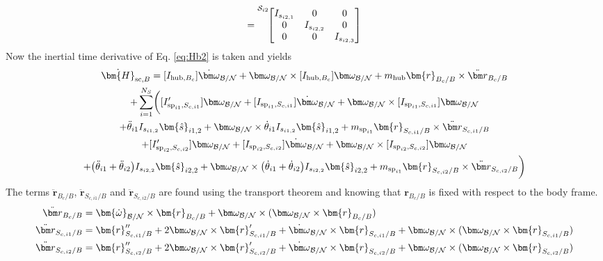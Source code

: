 \begin{equation}
	[I_{\text{sp}_{i2},S_{c,i2}}] = {\vphantom{\begin{bmatrix}
				I_{s_{i2,1}} & 0 & 0 \\
				0 & I_{s_{i2,2}} & 0 \\
				0 & 0 & I_{s_{i2,3}}
	\end{bmatrix}}}^{\mathcal{S}_{i2}\!}{\begin{bmatrix}
			I_{s_{i2,1}} & 0 & 0 \\
			0 & I_{s_{i2,2}} & 0 \\
			0 & 0 & I_{s_{i2,3}}
	\end{bmatrix}}
\end{equation}
Now the inertial time derivative of Eq. \eqref{eq:Hb2} is taken and yields
\begin{multline}
	\dot{\bm{H}}_{\text{sc},B} = [I_{\text{hub},B_c}] \dot{\bm\omega}_{\cal B/N} + \bm\omega_{\cal B/N} \times [I_{\text{hub},B_c}] \bm\omega_{\cal B/N} + m_{\text{hub}} \bm{r}_{B_c/B}\times\ddot{\bm r}_{B_c/B}\\ +\sum\limits_{i=1}^{N_S} \biggl( [I'_{\text{sp}_{i1},S_{c,i1}}] \bm\omega_{\cal B/N} + [I_{\text{sp}_{i1},S_{c,i1}}] \dot{\bm\omega}_{\cal B/N} + \bm\omega_{\cal B/N} \times [I_{\text{sp}_{i1},S_{c,i1}}] \bm\omega_{\cal B/N}\\
	+ \ddot{\theta}_{i1} I_{s_{i1,2}}\bm{\hat{s}}_{i1,2}+ \bm\omega_{\cal B/N} \times \dot{\theta}_{i1} I_{s_{i1,2}}\bm{\hat{s}}_{i1,2} +m_{\text{sp}_{i1}} \bm{r}_{S_{c,i1}/B} \times \ddot{\bm r}_{S_{c,i1}/B}\\
	+ [I'_{\text{sp}_{i2},S_{c,i2}}] \bm\omega_{\cal B/N} + [I_{\text{sp}_{i2},S_{c,i2}}] \dot{\bm\omega}_{\cal B/N} + \bm\omega_{\cal B/N} \times [I_{\text{sp}_{i2},S_{c,i2}}] \bm\omega_{\cal B/N}\\
	+ \big(\ddot{\theta}_{i1} + \ddot{\theta}_{i2}\big) I_{s_{i2,2}}\bm{\hat{s}}_{i2,2}+ \bm\omega_{\cal B/N} \times \big(\dot{\theta}_{i1} + \dot{\theta}_{i2}\big) I_{s_{i2,2}}\bm{\hat{s}}_{i2,2} +m_{\text{sp}_{i1}} \bm{r}_{S_{c,i2}/B} \times \ddot{\bm r}_{S_{c,i2}/B}\biggr)
	\label{eq:Hbdot}
\end{multline}
The terms $\ddot{\bm r}_{B_c/B}$, $\ddot{\bm r}_{S_{c,i1}/B}$ and $\ddot{\bm r}_{S_{c,i2}/B}$ are found using the transport theorem and knowing that $\bm{r}_{B_c/B}$ is fixed with respect to the body frame.
\begin{align}
	\ddot{\bm r}_{B_c/B} &= \bm{\dot{\omega}}_{\cal B/N} \times \bm{r}_{B_c/B} + \bm\omega_{\cal B/N} \times (\bm\omega_{\cal B/N} \times \bm{r}_{B_c/B})
	\label{eq:rbddot}
	\\
	\ddot{\bm r}_{S_{c,i1}/B} &= \bm{r}''_{S_{c,i1}/B} + 2 \bm\omega_{\cal B/N} \times \bm{r}'_{S_{c,i1}/B} +  \dot{\bm\omega}_{\cal B/N} \times \bm{r}_{S_{c,i1}/B} + \bm\omega_{\cal B/N} \times (\bm\omega_{\cal B/N} \times \bm{r}_{S_{c,i1}/B})
	\label{eq:rsddot}
	\\
	\ddot{\bm r}_{S_{c,i2}/B} &= \bm{r}''_{S_{c,i2}/B} + 2 \bm\omega_{\cal B/N} \times \bm{r}'_{S_{c,i2}/B} +  \dot{\bm\omega}_{\cal B/N} \times \bm{r}_{S_{c,i2}/B} + \bm\omega_{\cal B/N} \times (\bm\omega_{\cal B/N} \times \bm{r}_{S_{c,i2}/B})
	\label{eq:rsddot2}
\end{align}
